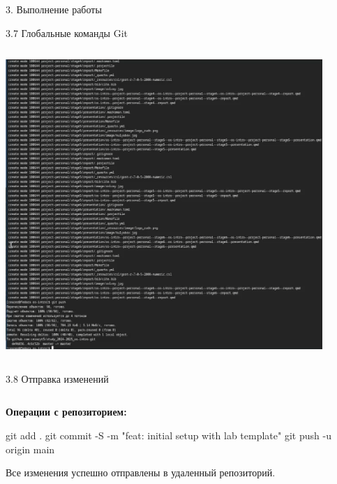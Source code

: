 \documentclass[
  ignorenonframetext,
  aspectratio=169,
]{beamer}
\newenvironment{Shaded}{\begin{snugshade}}{\end{snugshade}}
\newcommand{\AttributeTok}[1]{\textcolor[rgb]{0.40,0.45,0.13}{#1}}
\newcommand{\FunctionTok}[1]{\textcolor[rgb]{0.28,0.35,0.67}{#1}}
\newcommand{\NormalTok}[1]{\textcolor[rgb]{0.00,0.23,0.31}{#1}}
\newcommand{\StringTok}[1]{\textcolor[rgb]{0.13,0.47,0.30}{#1}}
\begin{document}
\begin{frame}[fragile]{3. Выполнение работы}
\begin{block}{3.7 Глобальные команды Git}
\begin{columns}[c]
\begin{column}{0.4\textwidth}
\includegraphics[width=0.9\textwidth,height=\textheight]{./image/push.png}
\end{column}
\end{columns}
\end{block}

\begin{block}{3.8 Отправка изменений}
\label{ux43eux442ux43fux440ux430ux432ux43aux430-ux438ux437ux43cux435ux43dux435ux43dux438ux439}
\begin{columns}[c]
\begin{column}{0.6\textwidth}
\textbf{Операции с репозиторием:}

\begin{Shaded}
\begin{Highlighting}[]
\FunctionTok{git}\NormalTok{ add .}
\FunctionTok{git}\NormalTok{ commit }\AttributeTok{{-}S} \AttributeTok{{-}m} \StringTok{"feat: initial setup with lab template"}
\FunctionTok{git}\NormalTok{ push }\AttributeTok{{-}u}\NormalTok{ origin main}
\end{Highlighting}
\end{Shaded}

Все изменения успешно отправлены в удаленный репозиторий.
\end{column}


\end{columns}
\end{block}
\end{frame}
\end{document}
